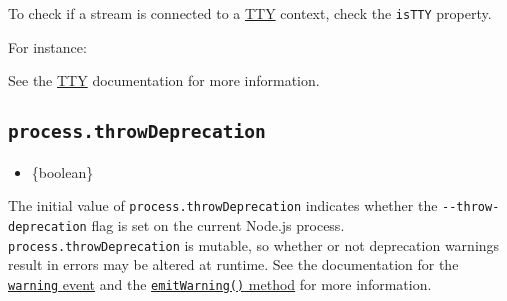 To check if a stream is connected to a \href{tty.md\#tty}{TTY} context,
check the \texttt{isTTY} property.

For instance:

\begin{Shaded}
\begin{Highlighting}[]
\end{Highlighting}
\end{Shaded}

See the \href{tty.md\#tty}{TTY} documentation for more information.

\subsection{\texorpdfstring{\texttt{process.throwDeprecation}}{process.throwDeprecation}}\label{process.throwdeprecation}

\begin{itemize}
\tightlist
\item
  \{boolean\}
\end{itemize}

The initial value of \texttt{process.throwDeprecation} indicates whether
the \texttt{-\/-throw-deprecation} flag is set on the current Node.js
process. \texttt{process.throwDeprecation} is mutable, so whether or not
deprecation warnings result in errors may be altered at runtime. See the
documentation for the
\hyperref[event-warning]{\texttt{\textquotesingle{}warning\textquotesingle{}}
event} and the
\hyperref[processemitwarningwarning-type-code-ctor]{\texttt{emitWarning()}
method} for more information.

\begin{Shaded}
\begin{Highlighting}[]
\end{Highlighting}
\end{Shaded}

